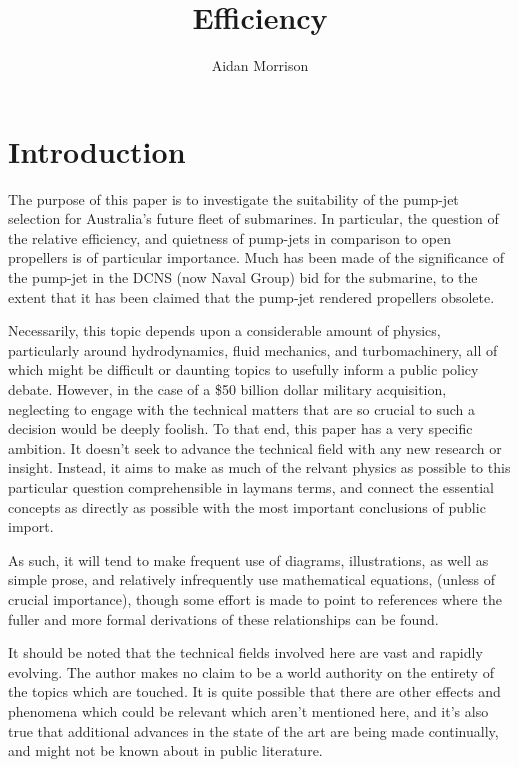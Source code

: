\documentclass{article}\usepackage[]{graphicx}\usepackage[]{color}
\title{Efficiency}
\author{Aidan Morrison}
\begin{document}
\maketitle




\tableofcontents

\section{Introduction}

The purpose of this paper is to investigate the suitability of the pump-jet selection for Australia's future fleet of submarines.  In particular, the question of the relative efficiency, and quietness of pump-jets in comparison to open propellers is of particular importance.  Much has been made of the significance of the pump-jet in the DCNS (now Naval Group) bid for the submarine, to the extent that it has been claimed that the pump-jet rendered propellers obsolete.

Necessarily, this topic depends upon a considerable amount of physics, particularly around hydrodynamics, fluid mechanics, and turbomachinery, all of which might be difficult or daunting topics to usefully inform a public policy debate. However, in the case of a \$50 billion dollar military acquisition, neglecting to engage with the technical matters that are so crucial to such a decision would be deeply foolish.  To that end, this paper has a very specific ambition.  It doesn't seek to advance the technical field with any new research or insight.  Instead, it aims to make as much of the relvant physics as possible to this particular question comprehensible in laymans terms, and connect the essential concepts as directly as possible with the most important conclusions of public import.

As such, it will tend to make frequent use of diagrams, illustrations, as well as simple prose, and relatively infrequently use mathematical equations, (unless of crucial importance), though some effort is made to point to references where the fuller and more formal derivations of these relationships can be found.

It should be noted that the technical fields involved here are vast and rapidly evolving.  The author makes no claim to be a world authority on the entirety of the topics which are touched. It is quite possible that there are other effects and phenomena which could be relevant which aren't mentioned here, and it's also true that additional advances in the state of the art are being made continually, and might not be known about in public literature.
\end{document}
